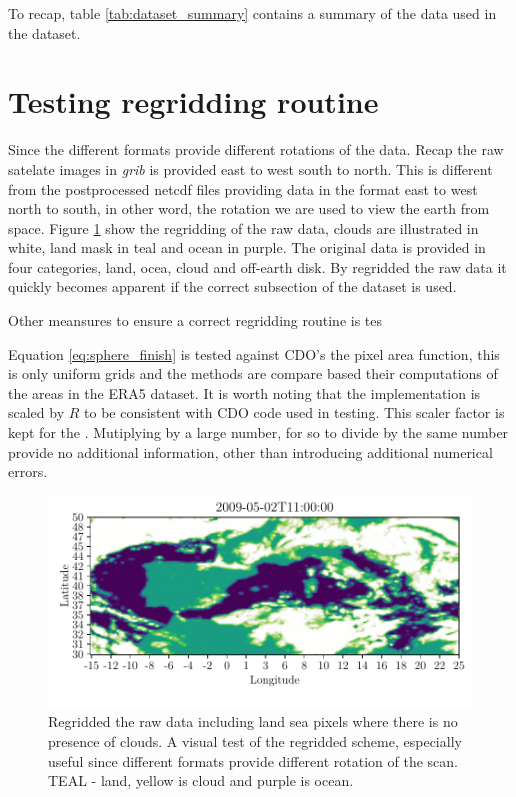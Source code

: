 To recap, table \ref{tab:dataset_summary} contains a summary of the data used in the dataset.

\section{Testing regridding routine}
Since the different formats provide different rotations of the data. Recap the raw satelate images in \textit{grib} is provided east to west south to north. This is different from the postprocessed netcdf files providing data in the format east to west north to south, in other word, the rotation we are used to view the earth from space. Figure \ref{fig:visual_inspection_regridding} show the regridding of the raw data, clouds are illustrated in white, land mask in teal and ocean in purple. 
The original data is provided in four categories, land, ocea, cloud and off-earth disk. By regridded the raw data it quickly becomes apparent if the correct subsection of the dataset is used. 

Other meansures to ensure a correct regridding routine is tes

Equation \ref{eq:sphere_finish} is tested against CDO's the pixel area function, this is only uniform grids and the methods are compare based their computations of the areas in the ERA5 dataset. It is worth noting that the implementation is scaled by $R$ to be consistent with CDO code used in testing. This scaler factor is kept for the . Mutiplying by a large number, for so to divide by the same number provide no additional information, other than introducing additional numerical errors. 

\begin{figure}
    \centering
    \includegraphics{python_figs/visual_regridding.pdf}
    \caption{Regridded the raw data including land sea pixels where there is no presence of clouds. A visual test of the regridded scheme, especially useful since different formats provide different rotation of the scan. TEAL - land, yellow is cloud and purple is ocean.}
    \label{fig:visual_inspection_regridding}
\end{figure}

